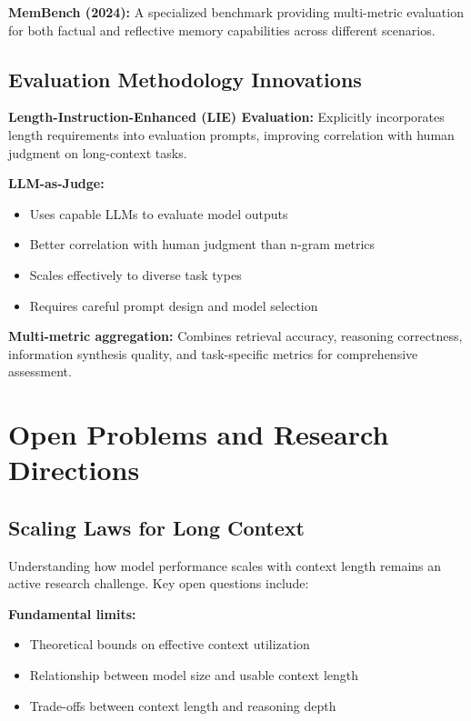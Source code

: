 \documentclass[11pt]{article}
\begin{document}
\textbf{MemBench (2024):} A specialized benchmark providing multi-metric evaluation for both factual and reflective memory capabilities across different scenarios.

\subsection{Evaluation Methodology Innovations}

\textbf{Length-Instruction-Enhanced (LIE) Evaluation:}
Explicitly incorporates length requirements into evaluation prompts, improving correlation with human judgment on long-context tasks.

\textbf{LLM-as-Judge:}
\begin{itemize}[leftmargin=*]
    \item Uses capable LLMs to evaluate model outputs
    \item Better correlation with human judgment than n-gram metrics
    \item Scales effectively to diverse task types
    \item Requires careful prompt design and model selection
\end{itemize}

\textbf{Multi-metric aggregation:}
Combines retrieval accuracy, reasoning correctness, information synthesis quality, and task-specific metrics for comprehensive assessment.

\section{Open Problems and Research Directions}

\subsection{Scaling Laws for Long Context}

Understanding how model performance scales with context length remains an active research challenge. Key open questions include:

\textbf{Fundamental limits:}
\begin{itemize}[leftmargin=*]
    \item Theoretical bounds on effective context utilization
    \item Relationship between model size and usable context length
    \item Trade-offs between context length and reasoning depth
\end{itemize}
\end{document}
